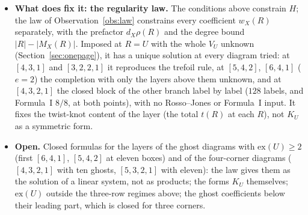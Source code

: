 \documentclass[11pt]{article}
\newcommand{\LMPH}[1]{\texttt{#1}}
\begin{document}
\begin{itemize}
ends attained: exact on all $522$ stored double-braid values up to six boxes (check \LMPH{dbraid}), and on the other
branch's values at eight to eleven boxes.  The mirror symmetry and the amphichirality of $\mathrm{DB}(m,-m)$ add no
condition, by the mirror covariance of Observation~\ref{obs:monomial}.  The counts, with the rows fixed by the zero rule
and the support principle of the other branch:
\begin{itemize}
\item at $[4,3,1]$, polynomiality of all double braids leaves one parameter and Rosso--Jones fixes it, which reproduces
the trefoil rule;
\item at $[5,4,2]$ and $[6,4,1]$ ($e=2$) it leaves $18$, and $17$ with Rosso--Jones; $11$ of these lie in the
twist-invisible square $s(A)\,u\otimes u$, $u$ the ghost direction with $\phi_u(\pm1)=0$.  One exact
$H_U(7_4)=H_U(\mathrm{DB}(2,2))$ or $H_U(8_3)=H_U(\mathrm{DB}(-2,2))$ would fix everything, while an exact $H_U(5_2)$
leaves $11$;
\item at $[4,3,2,1]$ the block of the other branch has a twist-invisible part (rank $8$ on the nine-dimensional space
$\{u:\phi_u(\pm1)=0\}$), and deforming it there changes no twist knot at $R=U$.  Polynomiality leaves $15$ parameters for
one such direction and $511$ for the deformations on the five canonical ghosts with $\phi(\pm1)=0$.
\end{itemize}
What survives is a polynomial multiple, $s(A)=s_0(A)\,p(A^2)$ with $\deg p$ bounded only by the narrowest window, which no
linear polynomiality condition removes.  So none of these conditions at $R=U$ fixes the layer for $e\ge2$.  The twist
knots at $R\supsetneq U$ do see the invisible part, since they contract $K_U$ with $f(R)$ rather than $f(U)$; their
polynomiality was not tested.
\item \textbf{What does fix it: the regularity law.}  The conditions above constrain $H$; the law of
Observation~\ref{obs:law} constrains every coefficient $w_X(R)$ separately, with the prefactor $d_X\rho(R)$ and the degree
bound $|R|-|M_X(R)|$.  Imposed at $R=U$ with the whole $V_U$ unknown (Section~\ref{sec:onepage}), it has a unique solution at
every diagram tried: at $[4,3,1]$ and $[3,2,2,1]$ it reproduces the trefoil rule, at $[5,4,2]$, $[6,4,1]$ ($e=2$) the
completion with only the layers above them unknown, and at $[4,3,2,1]$ the closed block of the other branch label by label
($128$ labels, and Formula~I $8/8$, at both points), with no Rosso--Jones or Formula~I input.  It fixes the twist-knot content of the layer
(the total $t(R)$ at each $R$), not $K_U$ as a symmetric form.
\item \textbf{Open.}  Closed formulas for the layers of the ghost diagrams with $\mathrm{ex}(U)\ge2$ (first $[6,4,1]$,
$[5,4,2]$ at eleven boxes) and of the four-corner diagrams ($[4,3,2,1]$ with ten ghosts, $[5,3,2,1]$ with eleven): the law
gives them as the solution of a linear system, not as products; the forms $K_U$ themselves; $\mathrm{ex}(U)$ outside the
three-row regimes above; the ghost coefficients below their leading part, which is closed for three corners.
\end{itemize}
\end{document}
